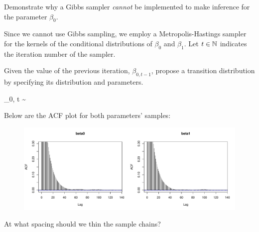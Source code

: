 \documentclass[12pt]{article}
\begin{document}
\begin{enumerate}[(a)]
 Demonstrate why a Gibbs sampler \emph{cannot} be implemented to make inference for the parameter $\beta_0$.


Since we cannot use Gibbs sampling, we employ a Metropolis-Hastings sampler for the kernels of the conditional distributions of $\beta_0$ and $\beta_1$. Let $t \in \mathbb{N}$ indicates the iteration number of the sampler. 

 Given the value of the previous iteration, $\beta_{0, t - 1}$, propose a transition distribution by specifying its distribution and parameters. 

\beqn
\beta_{0, t} \sim {} \hspace{6in}
\eeqn

Below are the ACF plot for both parameters' samples:
\vspace{-0.4cm}
\begin{figure}[htp]
\centering
\includegraphics[width=6.0in]{acfs}
\end{figure}
\FloatBarrier
\vspace{-0.7cm}

 At what spacing should we thin the sample chains? 


\end{enumerate}
\end{document}
